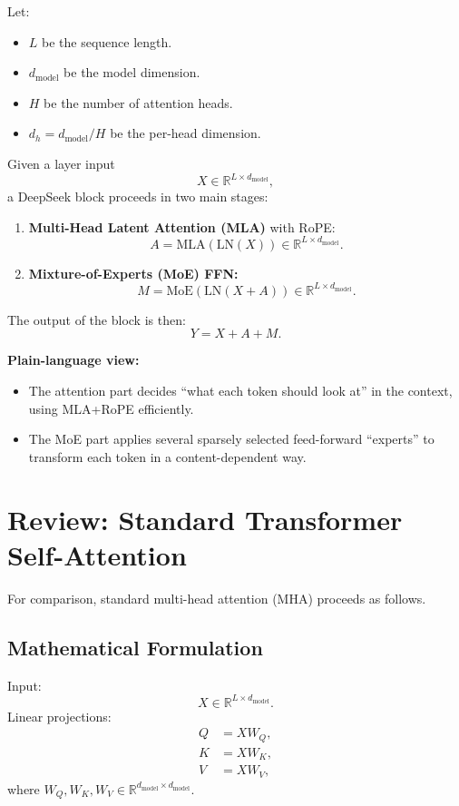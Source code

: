 \documentclass[11pt]{article}
\theoremstyle{remark}
\begin{document}
Let:
\begin{itemize}
  \item $L$ be the sequence length.
  \item $d_{\text{model}}$ be the model dimension.
  \item $H$ be the number of attention heads.
  \item $d_h = d_{\text{model}} / H$ be the per-head dimension.
\end{itemize}

Given a layer input
\[
X \in \mathbb{R}^{L \times d_{\text{model}}},
\]
a DeepSeek block proceeds in two main stages:
\begin{enumerate}[label=\arabic*)]
  \item \textbf{Multi-Head Latent Attention (MLA)} with RoPE:
  \[
  A = \text{MLA}( \text{LN}(X) ) \in \mathbb{R}^{L \times d_{\text{model}}}.
  \]
  \item \textbf{Mixture-of-Experts (MoE) FFN:}
  \[
  M = \text{MoE}( \text{LN}(X + A) ) \in \mathbb{R}^{L \times d_{\text{model}}}.
  \]
\end{enumerate}
The output of the block is then:
\[
Y = X + A + M.
\]

\textbf{Plain-language view:}
\begin{itemize}
  \item The attention part decides ``what each token should look at'' in the context, using MLA+RoPE efficiently.
  \item The MoE part applies several sparsely selected feed-forward ``experts'' to transform each token in a content-dependent way.
\end{itemize}

\section{Review: Standard Transformer Self-Attention}

For comparison, standard multi-head attention (MHA) proceeds as follows.

\subsection{Mathematical Formulation}

Input:
\[
X \in \mathbb{R}^{L \times d_{\text{model}}}.
\]
Linear projections:
\begin{align*}
Q &= X W_Q, \\
K &= X W_K, \\
V &= X W_V,
\end{align*}
where $W_Q, W_K, W_V \in \mathbb{R}^{d_{\text{model}} \times d_{\text{model}}}$.
\end{document}
